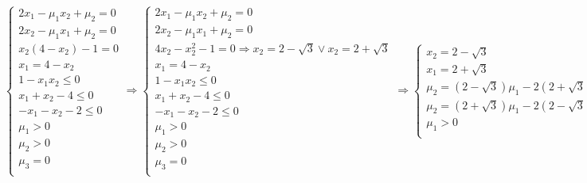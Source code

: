 \documentclass[\main/main.tex]{subfiles}
\begin{document}
\[
  \begin{cases}
    2x_1-\mu_1x_2 + \mu_2 = 0 \\
    2x_2-\mu_1x_1 + \mu_2 = 0 \\
    x_2(4-x_2)-1 = 0          \\
    x_1 = 4-x_2               \\
    1-x_1x_2 \leq 0           \\
    x_1 + x_2 -4 \leq 0       \\
    -x_1 - x_2 - 2 \leq 0     \\
    \mu_1 > 0                 \\
    \mu_2 > 0                 \\
    \mu_3 = 0                 \\
  \end{cases}
  \Rightarrow
  \begin{cases}
    2x_1-\mu_1x_2 + \mu_2 = 0                                           \\
    2x_2-\mu_1x_1 + \mu_2 = 0                                           \\
    4x_2-x^2_2-1 = 0 \Rightarrow x_2 = 2-\sqrt{3} \lor x_2 = 2+\sqrt{3} \\
    x_1 = 4-x_2                                                         \\
    1-x_1x_2 \leq 0                                                     \\
    x_1 + x_2 -4 \leq 0                                                 \\
    -x_1 - x_2 - 2 \leq 0                                               \\
    \mu_1 > 0                                                           \\
    \mu_2 > 0                                                           \\
    \mu_3 = 0                                                           \\
  \end{cases}
  \Rightarrow
  \begin{cases}
    x_2 = 2-\sqrt{3}                        \\
    x_1 = 2+\sqrt{3}                        \\
    \mu_2 = (2-\sqrt{3})\mu_1-2(2+\sqrt{3}) \\
    \mu_2 = (2+\sqrt{3})\mu_1-2(2-\sqrt{3}) \\
    \mu_1 > 0                               \\

\end{cases}\]
\end{document}
